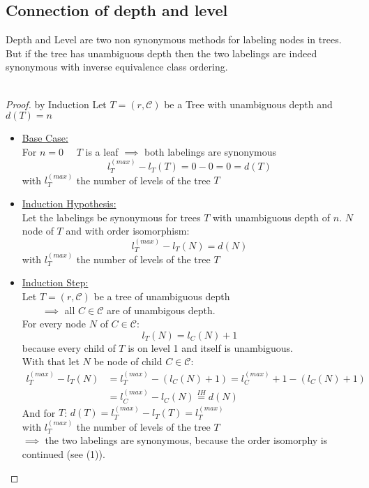 \documentclass[a4paper,12pt]{article}
\theoremstyle{definition}
\begin{document}
	\subsection{Connection of depth and level}
	Depth and Level are two non synonymous methods for labeling nodes in trees.\\
	But if the tree has unambiguous depth then the two labelings are indeed synonymous with inverse equivalence class ordering.
	\\\\
	 \begin{proof}
	 	by Induction  Let $T=(r,\mathcal{C})$ be a Tree with unambiguous depth and $d(T)=n$\\
	 	\begin{itemize}
	 		\item \underline{Base Case:}\\
	 		For $n=0\quad$ $T$ is a leaf $\implies$ both labelings are synonymous
	 		\[l_T^{(max)}-l_T(T)=0-0=0=d(T)\]
	 		with $l_T^{(max)}$ the number of levels of the tree $T$
	 		\item \underline{Induction Hypothesis:}\\
	 		Let the labelings be synonymous for trees $T$ with unambiguous depth of $n$.
	 		$N$ node of $T$ and with order isomorphism:
	 		\[l_T^{(max)}-l_T(N)=d(N)\]
	 		with $l_T^{(max)}$ the number of levels of the tree $T$
	 		\item \underline{Induction Step:}\\
	 		Let $T=(r,\mathcal{C})$ be a tree of unambiguous depth\\
	 		$\qquad\implies $ all $C\in\mathcal{C}$ are of unambigous depth.\\
	 		For every node $N$ of $C\in\mathcal{C}:$\[ l_T(N)=l_C(N)+1\] because every child of $T$ is on level 1 and itself is unambiguous.\\
	 		With that let $N$ be node of child $C\in\mathcal{C}$:
	 		\begin{align}
	 			l_T^{(max)}-l_T(N)&=l_T^{(max)}-(l_C(N) + 1)=l_C^{(max)} + 1 -(l_C(N) + 1)\\
	 			&= l_C^{(max)}-l_C(N) \overset{IH}{=} d(N)
	 		\end{align}
	 		And for $T$: $d(T)=l_T^{(max)} - l_T(T)=l_T^{(max)}$\\
	 		with $l_T^{(max)}$ the number of levels of the tree $T$\\
	 		$\implies$ the two labelings are synonymous, because the order isomorphy is continued  (see (1)).
	 	\end{itemize}
	 \end{proof}
\end{document}
